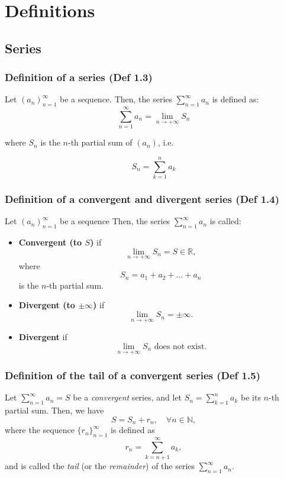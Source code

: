 \section{Definitions}

\subsection{Series}

\subsubsection{Definition of a series (Def 1.3)}

Let \(\left( a_n \right)_{n=1}^{\infty}\) be a sequence. Then, the series \(\sum_{n=1}^{\infty} a_n\) is defined as:
\[
    \sum_{n = 1}^{\infty} a_n = \lim_{n \rightarrow +\infty} S_n
\]

where $S_n$ is the $n$-th partial sum of \(\left( a_n \right)\), i.e.

\[
    S_n = \sum_{k = 1}^{n}a_k
\]

\subsubsection{Definition of a convergent and divergent series (Def 1.4)}

Let \((a_n)_{n=1}^{\infty}\) be a sequence
Then, the series \(\sum_{n=1}^{\infty} a_n\) is called:

\begin{itemize}
    \item \textbf{Convergent (to \(S\))} if
    \[
        \lim_{n \to +\infty} S_n = S \in \mathbb{R},
    \]
    where
    \[
        S_n = a_1 + a_2 + \dots + a_n
    \]
    is the \(n\)-th partial sum.

    \item \textbf{Divergent (to \(\pm \infty\))} if
    \[
        \lim_{n \to +\infty} S_n = \pm \infty.
    \]

    \item \textbf{Divergent} if
    \[
        \lim_{n \to +\infty} S_n \text{ does not exist}.
    \]
\end{itemize}

\subsubsection{Definition of the tail of a convergent series (Def 1.5)}

Let $\sum_{n=1}^\infty a_n = S$ be a \textit{convergent} series, and let $S_n = \sum_{k=1}^n a_k$ be its $n$-th partial sum.
Then, we have
\[S = S_n + r_n, \quad \forall n \in \mathbb{N},
\]
where the sequence $\{r_n\}_{n=1}^\infty$ is defined as
\[
    r_n = \sum_{k=n+1}^\infty a_k,
\]
and is called the \textit{tail} (or the \textit{remainder}) of the series $\sum_{n=1}^\infty a_n$.


